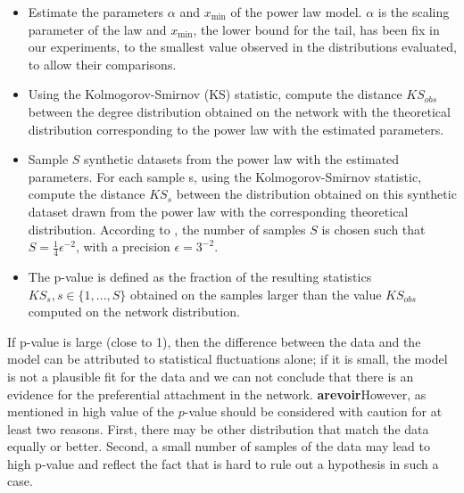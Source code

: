 \begin{itemize}
	\item Estimate the parameters $\alpha$ and $x_\text{min}$ of the power law model. $\alpha$ is the scaling parameter of the law and $x_\text{min}$, the lower bound for the tail,  has been fix in our experiments, to the smallest value observed in the distributions evaluated, to allow their comparisons.
	\item  Using the Kolmogorov-Smirnov (KS) statistic, compute the distance $KS_{obs}$  between the degree distribution obtained on the network with the theoretical distribution corresponding to the power law with the estimated parameters.
	\item Sample $S$ synthetic datasets from the power law with the estimated parameters. For each sample s, using the Kolmogorov-Smirnov statistic, compute the distance $KS_{s}$ between the distribution obtained on this synthetic dataset drawn from the power law with the corresponding theoretical distribution. According to  \cite{clauset2009power}, the number of samples $S$ is chosen such that $S = \frac{1}{4}\epsilon^{-2}$, with a precision  $\epsilon = 3^{-2}$. 
    \item  The p-value is defined as the fraction of  the resulting statistics $KS_s, s \in \{1,...,S\}$ obtained on the samples larger than the value $KS_{obs}$ computed on the network distribution.  
\end{itemize}

 If  p-value is large (close to 1), then the difference between the data and the model can be attributed to statistical fluctuations alone; if it is small, the model is not a plausible fit for the data and we can not conclude that there is an evidence for the preferential attachment in the network. 
\textbf{arevoir}However, as mentioned in \cite{clauset2009power} high value of the $p$-value should be considered with caution for at least two reasons. First, there may be other distribution that match the data equally or better. Second, a small number of samples of the data may lead to high p-value and reflect the fact that is hard to rule out a hypothesis in such a case.


